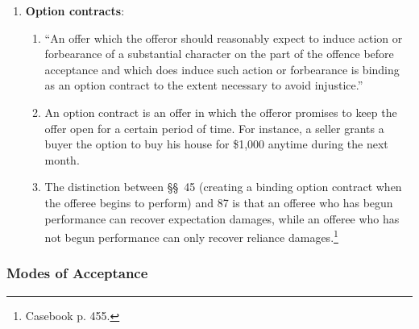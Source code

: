 \begin{enumerate}
\begin{enumerate}
\begin{enumerate}
\begin{enumerate}
                make a lower bid.
                \item \emph{Bid peddling}: a subcontractor waits until other 
                bids are in and then undercutting them, avoiding the cost of 
                estimating his own bid.
            \end{enumerate}
            \item Most courts have followed \emph{Drennan}, but at least one 
            as deviated.\footnote{Casebook p. 453.}
            \item \S\ 90 reliance damages may not be available when the 
            general contractor engages in these kinds of unethical practices.  
            \emph{Preload Technology, Inc. v. A.B. \& J. Construction Co., 
            Inc.}
        \end{enumerate}
        \item \textbf{Option contracts}:
        \begin{enumerate}
            \item ``An offer which the offeror should reasonably expect to 
            induce action or forbearance of a substantial character on the 
            part of the offence before acceptance and which does induce such 
            action or forbearance is binding as an option contract to the 
            extent necessary to avoid injustice.''
            \item An option contract is an offer in which the offeror promises 
            to keep the offer open for a certain period of time. For instance, 
            a seller grants a buyer the option to buy his house for \$1,000 
            anytime during the next month.
            \item The distinction between \S\S\ 45 (creating a binding option 
            contract when the offeree begins to perform) and 87 is that an 
            offeree who has begun performance can recover expectation damages, 
            while an offeree who has not begun performance can only recover 
            reliance damages.\footnote{Casebook p. 455.}
        \end{enumerate}
    \end{enumerate}
\end{enumerate}

\subsubsection{Modes of Acceptance}

